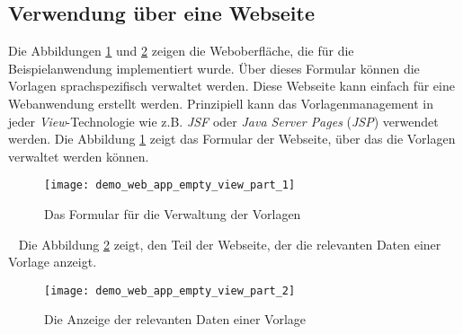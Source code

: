 \subsection{Verwendung über eine Webseite}
Die Abbildungen \ref{fig:demo_web_app_empty_view_part_1} und \ref{fig:demo_web_app_empty_view_part_2} zeigen die Weboberfläche, die für die Beispielanwendung implementiert wurde. Über dieses Formular können die Vorlagen sprachspezifisch verwaltet werden. Diese Webseite kann einfach für eine Webanwendung erstellt werden. Prinzipiell kann das Vorlagenmanagement in jeder \emph{View}-Technologie wie z.B. \emph{JSF} oder \emph{Java Server Pages} (\emph{JSP}) verwendet werden.
\newline
\newline
Die Abbildung \ref{fig:demo_web_app_empty_view_part_1} zeigt das Formular der Webseite, über das die Vorlagen verwaltet werden können.
\newpage
\begin{figure}[h]
\centering
\texttt{[image: demo\_web\_app\_empty\_view\_part\_1]}
\caption{Das Formular für die Verwaltung der Vorlagen}
\label{fig:demo_web_app_empty_view_part_1}
\end{figure}
\ \newline
Die Abbildung \ref{fig:demo_web_app_empty_view_part_2} zeigt, den Teil der Webseite, der die relevanten Daten einer Vorlage anzeigt.

\begin{figure}[h]
\centering
\texttt{[image: demo\_web\_app\_empty\_view\_part\_2]}
\caption{Die Anzeige der relevanten Daten einer Vorlage}
\label{fig:demo_web_app_empty_view_part_2}
\end{figure}
\ \newpage

